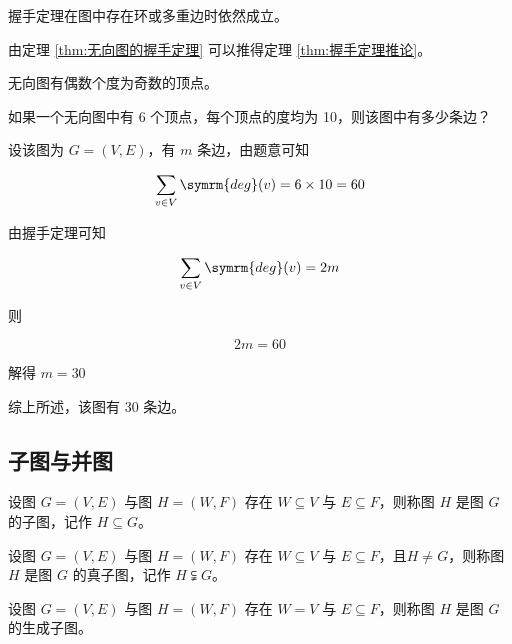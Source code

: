 \documentclass[lang=cn, chinesefont=founder, color=cyan, citestyle=gb7714-2015, bibstyle=gb7714-2015]{elegantbook}
\begin{document}
握手定理在图中存在环或多重边时依然成立。

由定理 \ref{thm:无向图的握手定理} 可以推得定理 \ref{thm:握手定理推论}。
\begin{theorem}\label{thm:握手定理推论}
    无向图有偶数个度为奇数的顶点。
\end{theorem}

\begin{collections}
    \begin{example}
        如果一个无向图中有 6 个顶点，每个顶点的度均为 10，则该图中有多少条边？
    \end{example}
    \begin{solution}
        设该图为 $G=(V, E)$，有 $m$ 条边，由题意可知

        $$\sum_{v \in V}\symrm{deg}(v) = 6 \times 10 = 60$$

        由握手定理可知

        $$\sum_{v \in V}\symrm{deg}(v) = 2m$$

        则

        $$2m = 60$$

        解得 $m=30$

        综上所述，该图有 $30$ 条边。
    \end{solution}
\end{collections}

\subsection{子图与并图}
\begin{definition}[子图]\label{def:子图}
    设图 $G=(V, E)$ 与图 $H=(W, F)$ 存在 $W \subseteq V$ 与 $E \subseteq F$，则称图 $H$ 是图 $G$ 的子图，记作 $H \subseteq G$。
\end{definition}
\begin{definition}[真子图]\label{def:真子图}
    设图 $G=(V, E)$ 与图 $H=(W, F)$ 存在 $W \subseteq V$ 与 $E \subseteq F$，且$H \neq G$，则称图 $H$ 是图 $G$ 的真子图，记作 $H \subsetneqq G$。
\end{definition}
\begin{definition}[生成子图]\label{def:生成子图}
    设图 $G=(V, E)$ 与图 $H=(W, F)$ 存在 $W = V$ 与 $E \subseteq F$，则称图 $H$ 是图 $G$ 的生成子图。
\end{definition}
\end{document}
